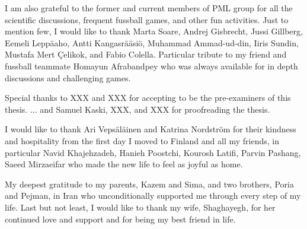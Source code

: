 \documentclass[dissertation,math,vertlayout,pdfa,colorlinks]{aaltoseries}
\begin{document}
\begin{preface}[Espoo]
I am also grateful to the former and current members of PML group for all the scientific discussions, frequent fussball games, and other fun activities. Just to mention few, I would like to thank Marta Soare, Andrej Gisbrecht, Jussi Gillberg, Eemeli Leppäaho, Antti Kangasrääsiö, Muhammad Ammad-ud-din, Iiris Sundin, Mustafa Mert \c{C}elikok, and Fabio Colella. Particular tribute to my friend and fussball teammate Homayun Afrabandpey who was always available for in depth discussions and challenging games. 

Special thanks to XXX and XXX for accepting to be the pre-examiners of this thesis. ... %
and Samuel Kaski, XXX, and XXX for proofreading the thesis. 

I would like to thank Ari Vepsäläinen and Katrina Nordström for their kindness and hospitality from the first day I moved to Finland and all my friends, in particular Navid Khajehzadeh, Hanieh Poostchi, Kourosh Latifi, Parvin Pashang, Saeed Mirzaeifar who made the new life to feel as joyful as home. %

My deepest gratitude to my parents, Kazem and Sima, and two brothers, Poria and Pejman, in Iran who unconditionally supported me through every step of my life. Last but not least, I would like to thank my wife, Shaghayegh, for her continued love and support and for being my best friend in life.

\end{preface}

\clearpage
\tableofcontents


\listofpublications



\end{document}
